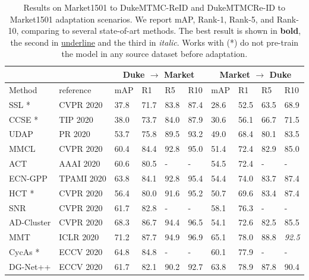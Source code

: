 \documentclass[journal]{IEEEtran}
\begin{document}
\begin{table*}[!ht]
\caption{Results on Market1501 to DukeMTMC-ReID and DukeMTMCRe-ID to Market1501 adaptation scenarios. We report mAP, Rank-1, Rank-5, and Rank-10, comparing to several state-of-art methods. The best result is shown in \textbf{bold}, the second in \underline{underline} and the third in \textit{italic}. Works with (*) do not pre-train the model in any source dataset before adaptation.}
\label{tab:MarketAndDuke}
\centering
\begin{tabular}{|p{2.7cm}| p{2.0cm}|p{0.8cm}|p{1.0cm}|p{1.0cm}|p{1.0cm}|p{0.8cm}|p{1.0cm}|p{1.0cm}|p{1.0cm}|}
\hline
\multicolumn{1}{|c|}{} &
\multicolumn{1}{|c|}{} &
\multicolumn{4}{|c|}{Duke $\rightarrow$ Market} & \multicolumn{4}{|c|}{Market $\rightarrow$ Duke} \\
\hline
Method & reference & mAP & R1 & R5 & R10
& mAP & R1 & R5 & R10 \\ \hline
SSL \cite{lin2020unsupervised}* & CVPR 2020 & 37.8 & 71.7 & 83.8 & 87.4 & 28.6 & 52.5 & 63.5 & 68.9 \\
CCSE \cite{lin2020unsupervisedccse}* & TIP 2020 & 38.0 & 73.7 & 84.0 & 87.9 & 30.6 & 56.1 & 66.7 & 71.5 \\
UDAP \cite{song2020unsupervised} & PR 2020 & 53.7 & 75.8 & 89.5 & 93.2 & 49.0 & 68.4 & 80.1 & 83.5 \\
MMCL \cite{wang2020unsupervised}& CVPR 2020 & 60.4 & 84.4 & 92.8 & 95.0 & 51.4 & 72.4 & 82.9 & 85.0 \\
ACT \cite{yang2020asymmetric} & AAAI 2020 & 60.6 & 80.5 & - & - & 54.5 & 72.4 & - & - \\
ECN-GPP \cite{zhong2020learning} & TPAMI 2020 & 63.8 & 84.1 & 92.8 & 95.4 & 54.4 & 74.0 & 83.7 & 87.4 \\
HCT \cite{zeng2020hierarchical}* & CVPR 2020 & 56.4 & 80.0 & 91.6 & 95.2 & 50.7 & 69.6 & 83.4 & 87.4 \\ 
SNR \cite{jin2020style} & CVPR 2020 & 61.7 & 82.8 & - & - & 58.1 & 76.3 & - & - \\
AD-Cluster \cite{zhai2020ad} & CVPR 2020 & 68.3 & 86.7 & 94.4 & 96.5 & 54.1 & 72.6 & 82.5 & 85.5 \\
MMT \cite{ge2020mutual} & ICLR 2020 & 71.2 & 87.7 & 94.9 & 96.9 & 65.1 & 78.0 & 88.8 & \textit{92.5} \\
CycAs \cite{wang2020cycas}* & ECCV 2020 & 64.8 & 84.8 & - & - & 60.1 & 77.9 & - & - \\
DG-Net++ \cite{zou2020joint} & ECCV 2020 & 61.7 & 82.1 & 90.2 & 92.7 & 63.8 & 78.9 & 87.8 & 90.4 \\

\end{tabular}
\end{table*}
\end{document}
